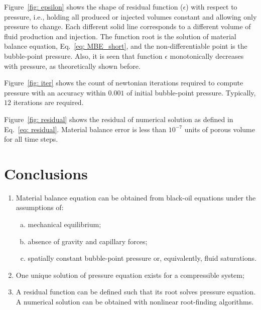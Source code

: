 \documentclass[final,authoryear,5p,times,twocolumn,10pt]{elsarticle}
\begin{document}
Figure~\ref{fig: epsilon} shows the shape of residual function ($\epsilon$) with respect to pressure, i.e., holding all produced or injected volumes constant and allowing only pressure to change. Each different solid line corresponds to a different volume of fluid production and injection. The function root is the solution of material balance equation, Eq.~\eqref{eq: MBE_short}, and the non-differentiable point is the bubble-point pressure. Also, it is seen that function $\epsilon$ monotonically decreases with pressure, as theoretically shown before.

Figure~\ref{fig: iter} shows the count of newtonian iterations required to compute pressure with an accuracy within $0.001$ of initial bubble-point pressure. Typically, $12$ iterations are required.

Figure~\ref{fig: residual} shows the residual of numerical solution as defined in Eq.~\eqref{eq: residual}. Material balance error is less than $10^{-7}$ units of porous volume for all time steps.



\section{Conclusions}
\begin{enumerate}[1.]
\item Material balance equation can be obtained from black-oil equations under the assumptions of:
\begin{enumerate}[(a)]
\item mechanical equilibrium;
\item absence of gravity and capillary forces;
\item spatially constant bubble-point pressure or, equivalently, fluid saturations.
\end{enumerate}
\item One unique solution of pressure equation exists for a compressible system;
\item A residual function can be defined such that its root solves pressure equation. A numerical solution can be obtained with nonlinear root-finding algorithms.
\end{enumerate}
\end{document}
